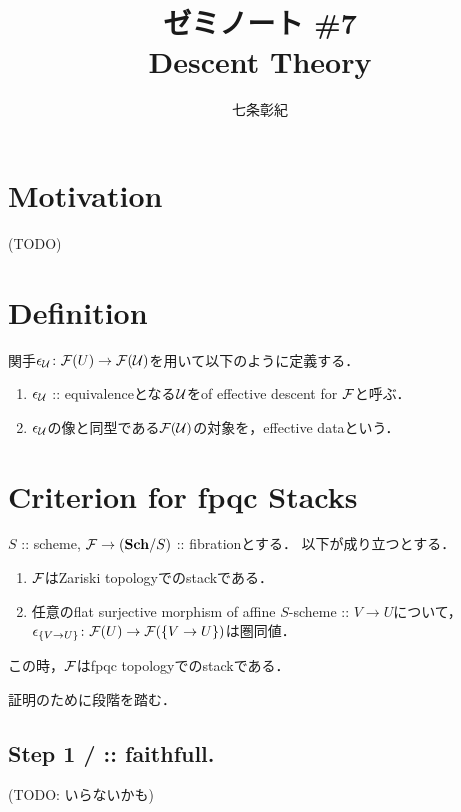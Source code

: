 \documentclass[a4paper, dvipdfmx]{jsarticle}
\begin{document}
\title{ゼミノート \#7 \\ Descent Theory}
\author{七条彰紀}
\maketitle

\newcommand{\QCoh}{\mathbf{QCoh}}
\newcommand{\vsim}{\text{\rotatebox{-90}{$\sim$}}}

\section{Motivation}
    (TODO)

\section{Definition}
\begin{Def}
    関手$\epsilon_{\mathcal{U}} \colon \mathcal{F}(U) \to \mathcal{F}(\mathcal{U})$を用いて以下のように定義する．
    \begin{enumerate}[label=(\roman*)]
        \item
            $\epsilon_{\covU}$ :: equivalenceとなる$\mathcal{U}$をof effective descent for $\mathcal{F}$と呼ぶ．
        \item
            $\epsilon_{\covU}$の像と同型である$\mathcal{F}(\mathcal{U})$の対象を，effective dataという．
    \end{enumerate}
\end{Def}

\section{Criterion for fpqc Stacks}
\begin{Lemma}
    $S$ :: scheme,
    $\mathcal{F} \to (\mathbf{Sch}/S)$ :: fibrationとする．
    以下が成り立つとする．
    \begin{enumerate}[label=(\alph*)]
        \item $\mathcal{F}$はZariski topologyでのstackである．
        \item
            任意のflat surjective morphism of affine $S$-scheme :: $V \to U$について，\mnewline
            $\epsilon_{\{V \to U\}} \colon \mathcal{F}(U) \to \mathcal{F}(\{V \to U\})$は圏同値．
    \end{enumerate}
    この時，$\mathcal{F}$はfpqc topologyでのstackである．
\end{Lemma}

証明のために段階を踏む．
\subsection{Step 1 / \tp{$\epsilon_{\covU}$} :: faithfull.}
    (TODO: いらないかも)
\end{document}
